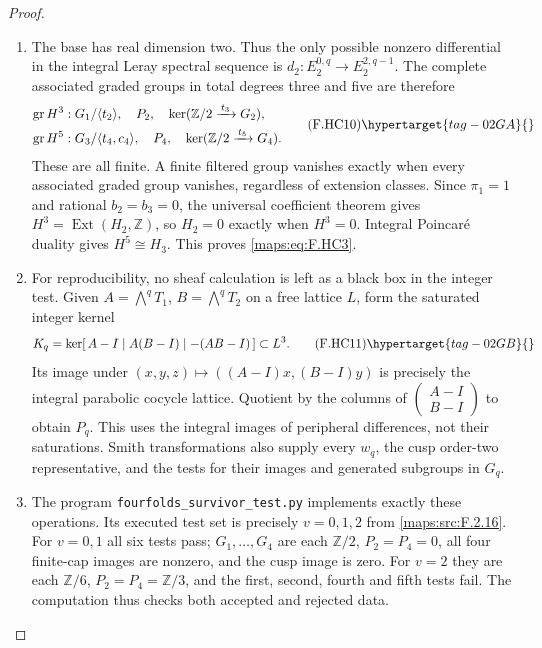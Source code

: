 \begin{proof}
\begin{enumerate}[label={$\langle1\rangle$\arabic*.}]
\item The base has real dimension two.
Thus the only possible nonzero differential in the
integral Leray spectral sequence is
$d_2:E_2^{0,q}\to E_2^{2,q-1}$.
The complete associated graded groups in total
degrees three and five are therefore
\[
\begin{split}
 \operatorname{gr}H^3&:
   G_1/\langle t_2\rangle,\quad P_2,\quad
   \ker(\mathbb Z/2\xrightarrow{\,t_3\,}G_2),\\
 \operatorname{gr}H^5&:
   G_3/\langle t_4,c_4\rangle,\quad P_4,\quad
   \ker(\mathbb Z/2\xrightarrow{\,t_5\,}G_4).
\end{split}
\tag{F.HC10}\hypertarget{tag-02GA}{}\label{maps:eq:F.HC10}
\]
These are all finite.  A finite filtered group
vanishes exactly when every associated graded group
vanishes, regardless of extension classes.
Since $\pi_1=1$ and rational $b_2=b_3=0$, the universal
coefficient theorem gives
$H^3=\operatorname{Ext}(H_2,\mathbb Z)$, so
$H_2=0$ exactly when $H^3=0$.
Integral Poincar\'e duality gives $H^5\cong H_3$.
This proves \eqref{maps:eq:F.HC3}.

\item For reproducibility, no sheaf calculation is left
as a black box in the integer test.
Given $A=\bigwedge^qT_1$, $B=\bigwedge^qT_2$ on a
free lattice $L$, form the saturated integer kernel
\[
 K_q=\ker[\,A-I\mid A(B-I)\mid -(AB-I)\,]\subset L^3.
 \tag{F.HC11}\hypertarget{tag-02GB}{}\label{maps:eq:F.HC11}
\]
Its image under
$(x,y,z)\mapsto((A-I)x,(B-I)y)$ is precisely the
integral parabolic cocycle lattice.
Quotient by the columns of
$\left(\begin{smallmatrix}A-I\\B-I\end{smallmatrix}\right)$
to obtain $P_q$.
This uses the integral images of peripheral
differences, not their saturations.
Smith transformations also supply every $w_q$, the
cusp order-two representative, and the tests for
their images and generated subgroups in $G_q$.

\item The program \texttt{fourfolds\_survivor\_test.py}
implements exactly these operations.
Its executed test set is precisely $v=0,1,2$ from
\ref{maps:src:F.2.16}.  For $v=0,1$ all six tests pass;
$G_1,\ldots,G_4$ are each $\mathbb Z/2$,
$P_2=P_4=0$, all four finite-cap images are nonzero,
and the cusp image is zero.
For $v=2$ they are each $\mathbb Z/6$,
$P_2=P_4=\mathbb Z/3$, and the first, second,
fourth and fifth tests fail.  The computation thus
checks both accepted and rejected data.


\end{enumerate}
\end{proof}
